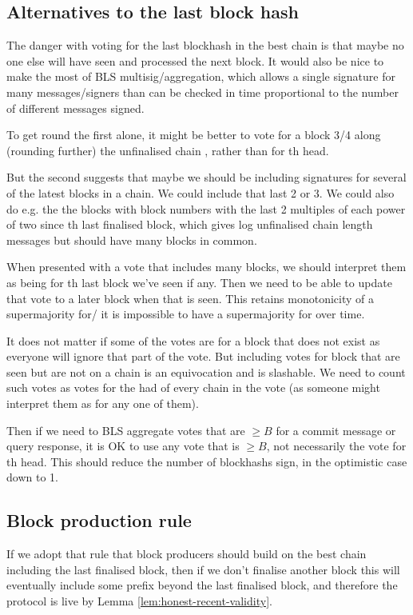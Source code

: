 \documentclass{article}
\begin{document}
{\subsection{Alternatives to the last block hash}

The danger with voting for the last blockhash in the best chain is that maybe no one else will have seen and processed the next block. It would also be nice to make the most of BLS multisig/aggregation, which allows a single signature for many messages/signers than can be checked in time proportional to the number of different messages signed. 

To get round the first alone, it might be better to vote for a block 3/4 along (rounding further) the unfinalised chain , rather than for th head.

But the second suggests that maybe we should be including signatures for several of the latest blocks in a chain. We could include that last 2 or 3. We could also do e.g. the the blocks with block numbers with the last 2 multiples of each power of two since th last finalised block, which gives log unfinalised chain length messages but should have many blocks in common.

When presented with a vote that includes many blocks, we should interpret them as being for th last block we've seen if any. Then we need to be able to update that vote to a later block when that is seen. This retains monotonicity of a supermajority for/ it is impossible to have a supermajority for over time.

It does not matter if some of the votes are for a block that does not exist as everyone will ignore that part of the vote. But including votes for block that are seen but are not on a chain is an equivocation and is slashable. We need to count such votes as votes for the had of every chain in the vote (as someone might interpret them as for any one of them).

Then if we need to BLS aggregate votes that are $\geq B$ for a commit message or query response, it is OK to use any vote that is $\geq B$, not necessarily the vote for th head. This should reduce the number of blockhashs sign, in the optimistic case down to 1.

\subsection{  Block production rule}

If we adopt that rule that block producers should build on the best chain including the last finalised block, then if we don't finalise another block this will eventually include some prefix  beyond the last finalised block, and therefore the protocol is live by Lemma \ref{lem:honest-recent-validity}.

}
\end{document}
